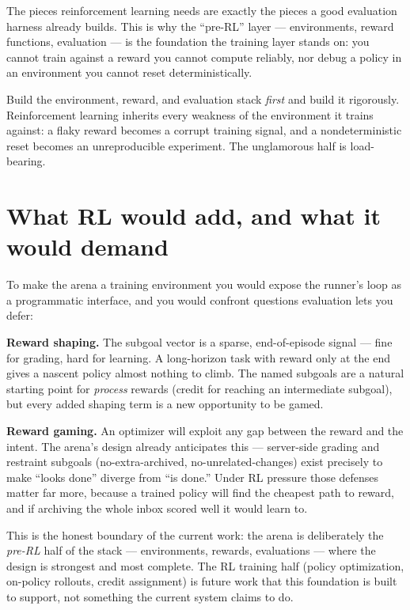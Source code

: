 \documentclass[11pt,openany]{book}
\newcommand{\code}[1]{\textcolor{clayd}{\texttt{\detokenize{#1}}}}
\begin{document}
The pieces reinforcement learning needs are exactly the pieces a good evaluation
harness already builds. This is why the ``pre-RL'' layer — environments, reward
functions, evaluation — is the foundation the training layer stands on: you cannot
train against a reward you cannot compute reliably, nor debug a policy in an
environment you cannot reset deterministically.

\begin{principle}[.\ ]
Build the environment, reward, and evaluation stack \emph{first} and build it
rigorously. Reinforcement learning inherits every weakness of the environment it
trains against: a flaky reward becomes a corrupt training signal, and a
nondeterministic reset becomes an unreproducible experiment. The unglamorous half
is load-bearing.
\end{principle}

\section{What RL would add, and what it would demand}

To make the arena a training environment you would expose the runner's loop as a
programmatic \code{step(action) -> (observation, reward, done)} interface, and you
would confront questions evaluation lets you defer:

\textbf{Reward shaping.} The subgoal vector is a sparse, end-of-episode signal —
fine for grading, hard for learning. A long-horizon task with reward only at the
end gives a nascent policy almost nothing to climb. The named subgoals are a
natural starting point for \emph{process} rewards (credit for reaching an
intermediate subgoal), but every added shaping term is a new opportunity to be
gamed.

\textbf{Reward gaming.} An optimizer will exploit any gap between the reward and
the intent. The arena's design already anticipates this — server-side grading and
restraint subgoals (no-extra-archived, no-unrelated-changes) exist precisely to
make ``looks done'' diverge from ``is done.'' Under RL pressure those defenses
matter far more, because a trained policy will find the cheapest path to reward,
and if archiving the whole inbox scored well it would learn to.

\begin{notebox}[.\ ]
This is the honest boundary of the current work: the arena is deliberately the
\emph{pre-RL} half of the stack — environments, rewards, evaluations — where the
design is strongest and most complete. The RL training half (policy optimization,
on-policy rollouts, credit assignment) is future work that this foundation is
built to support, not something the current system claims to do.
\end{notebox}
\end{document}
